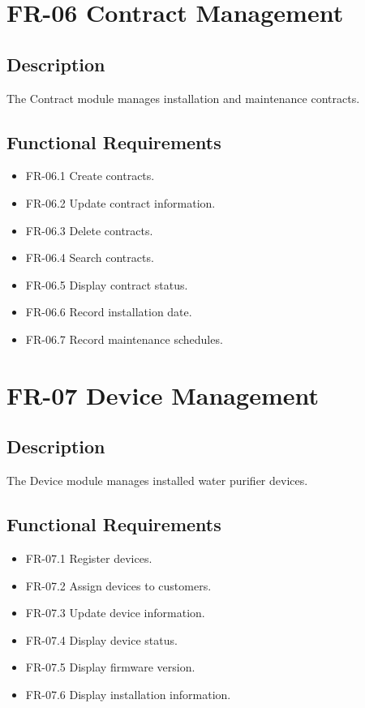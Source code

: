 \section{FR-06 Contract Management}

\subsection*{Description}

The Contract module manages installation and maintenance contracts.

\subsection*{Functional Requirements}

\begin{itemize}
    \item FR-06.1 Create contracts.
    \item FR-06.2 Update contract information.
    \item FR-06.3 Delete contracts.
    \item FR-06.4 Search contracts.
    \item FR-06.5 Display contract status.
    \item FR-06.6 Record installation date.
    \item FR-06.7 Record maintenance schedules.
\end{itemize}

\section{FR-07 Device Management}

\subsection*{Description}

The Device module manages installed water purifier devices.

\subsection*{Functional Requirements}

\begin{itemize}
    \item FR-07.1 Register devices.
    \item FR-07.2 Assign devices to customers.
    \item FR-07.3 Update device information.
    \item FR-07.4 Display device status.
    \item FR-07.5 Display firmware version.
    \item FR-07.6 Display installation information.
\end{itemize}

